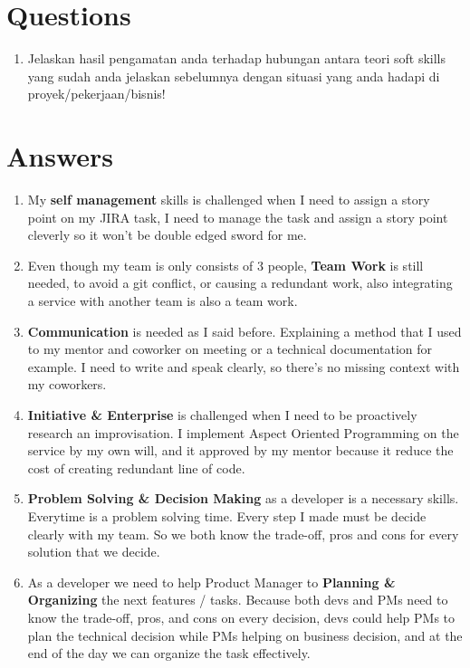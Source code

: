 \documentclass[12pt, letterpaper]{article}
\begin{document}
\section*{Questions}
\begin{enumerate}
    \item Jelaskan hasil pengamatan anda terhadap hubungan antara teori soft skills yang sudah anda jelaskan sebelumnya dengan situasi yang anda hadapi di proyek/pekerjaan/bisnis! 
\end{enumerate}

\section*{Answers}
\begin{enumerate}
    \item My \textbf{self management} skills is challenged when I need to assign a story point on my JIRA task, I need to manage the task and assign a story point cleverly so it won't be   double edged sword for me. 
    \item Even though my team is only consists of 3 people, \textbf{Team Work} is still needed, to avoid a git conflict, or causing a redundant work, also integrating a service with another team is also a team work.
    \item \textbf{Communication} is needed as I said before. Explaining a method that I used to my mentor and coworker on meeting or a technical documentation for example. I need to write and speak clearly, so there's no missing context with my coworkers.
    \item \textbf{Initiative \& Enterprise} is challenged when I need to be proactively research an improvisation. I implement Aspect Oriented Programming on the service by my own will, and it approved by my mentor because it reduce the cost of creating redundant line of code.
    \item \textbf{Problem Solving \& Decision Making} as a developer is a necessary skills. Everytime is a problem solving time. Every step I made must be decide clearly with my team. So we both know the trade-off, pros and cons for every solution that we decide.
    \item As a developer we need to help Product Manager to \textbf{Planning \& Organizing} the next features / tasks. Because both devs and PMs need to know the trade-off, pros, and cons on every decision, devs could help PMs to plan the technical decision while PMs helping on business decision, and at the end of the day we can organize the task effectively.
\end{enumerate}
\end{document}
